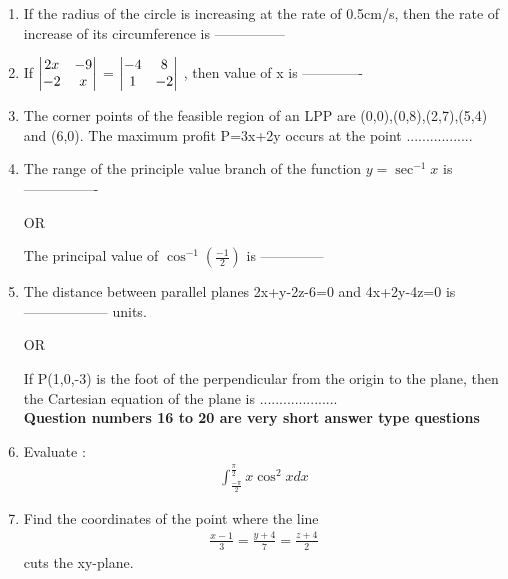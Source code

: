 \documentclass[journal,12pt,twocolumn]{IEEEtran}
\renewcommand\thesection{\arabic{section}}
\begin{document}
\begin{enumerate}[label=\thesection.\arabic*.,ref=\thesection.\theenumi]
\item  If the radius of the circle is increasing at the rate of 0.5cm/s, then the rate of increase of its circumference is ---------------\\
\item  If $\begin{vmatrix}2x & -9 \\ -2 & x\end{vmatrix} $ = $\begin{vmatrix}-4 & 8 \\ 1 & -2 \end{vmatrix}$ , then value of x is -------------\\
\item  The corner points of the feasible region of an LPP are (0,0),(0,8),(2,7),(5,4) and (6,0). The maximum profit P=3x+2y occurs at the point .................\\
\item  The range of the principle value branch of the function $ y= \sec^{-1}x $ is ----------------
    \begin{center}
        OR
    \end{center}
The principal value of $\cos^{-1} \left(\frac{-1}{2}\right)$ is --------------\\
\item  The distance between parallel planes 2x+y-2z-6=0 and 4x+2y-4z=0 is ------------------ units.
\begin{center}
        OR
    \end{center}
    If P(1,0,-3) is the foot of the perpendicular from the origin to the plane, then the Cartesian equation of the plane is .................... \\
    
\textbf{Question numbers 16 to 20 are very short answer type questions}\\  
\item  Evaluate :
	\begin{align}
         \int_{\frac{-\pi}{2}}^{\frac{\pi}{2}} x \cos^2 x dx \nonumber
	\end{align}  

\item  Find the coordinates of the point where the line 
        \begin{align}
        \frac{x-1}{3} = \frac{y+4}{7} = \frac{z+4}{2}
        \nonumber
	\end{align} 
        cuts the xy-plane. \\


\end{enumerate}
\end{document}

